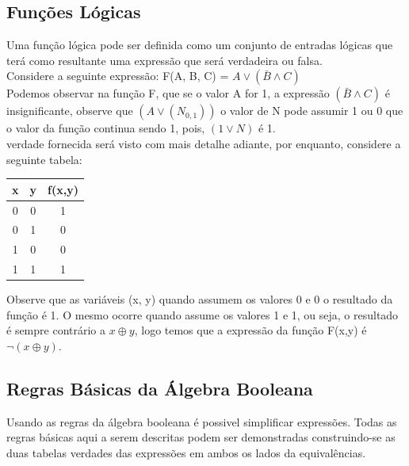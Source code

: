 \documentclass[12pt, onecolumn]{article}
\begin{document}
	\subsection{\centering Funções Lógicas}
	
	Uma função lógica pode ser definida como um conjunto de entradas lógicas
	que terá como resultante uma expressão que será verdadeira ou falsa.\\
	Considere a seguinte expressão: F(A, B, C) = $A \lor (\bar{B} \land C)$\\
	\newline
	Podemos observar na função F, que se o valor A for 1, a expressão 
	$(\bar{B} \land C)$ é insignificante, observe que $(A \lor (N_{0,1}))$ 
	o valor de N pode assumir 1 ou 0 que o valor da função continua sendo 1, 
	pois, $(1 \lor N)$ é 1.\\
	\newline
	verdade fornecida será visto com mais detalhe adiante, por enquanto,
	considere a seguinte tabela:\\
	\begin{table}[ht]
		\centering
		\begin{tabular}{|c|c|c|}
			\hline
			x & y & f(x,y)\\ \hline

			0 & 0 & 1 \\ \hline
			0 & 1 & 0 \\ \hline
			1 & 0 & 0 \\ \hline
			1 & 1 & 1 \\ \hline 
		\end{tabular}
	\end{table}

	Observe que as variáveis (x, y) quando assumem os valores 0 e 0
	o resultado da função é 1. O mesmo ocorre quando assume os valores
	1 e 1, ou seja, o resultado é sempre contrário a $x \oplus y$, logo 
	temos que a expressão da função F(x,y) é $\lnot (x \oplus y)$.

	\subsection{\centering Regras Básicas da Álgebra Booleana}

	Usando as regras da álgebra booleana é possivel simplificar expressões.
	Todas as regras básicas aqui a serem descritas podem ser demonstradas 
	construindo-se as duas tabelas verdades das expressões em ambos os
	lados da equivalências.\\
\end{document}

